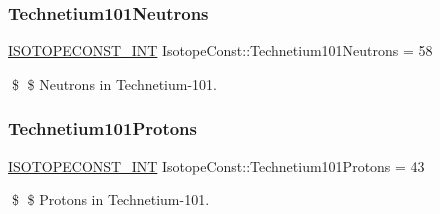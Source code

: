 \subsubsection{\texorpdfstring{Technetium101\+Neutrons}{Technetium101Neutrons}}
{\footnotesize\ttfamily \mbox{\hyperlink{group___isotope_const-_macros_ga5f18360b3e99483a35c32d789e62621c}{I\+S\+O\+T\+O\+P\+E\+C\+O\+N\+S\+T\+\_\+\+I\+NT}} Isotope\+Const\+::\+Technetium101\+Neutrons = 58}

\$ \$ Neutrons in Technetium-\/101. \mbox{\label{group___isotope_const-_technetium-_tc101_ga99bbdac8bb05a21e6c09ed74a7cd2f8b}} 
\subsubsection{\texorpdfstring{Technetium101\+Protons}{Technetium101Protons}}
{\footnotesize\ttfamily \mbox{\hyperlink{group___isotope_const-_macros_ga5f18360b3e99483a35c32d789e62621c}{I\+S\+O\+T\+O\+P\+E\+C\+O\+N\+S\+T\+\_\+\+I\+NT}} Isotope\+Const\+::\+Technetium101\+Protons = 43}

\$ \$ Protons in Technetium-\/101. 